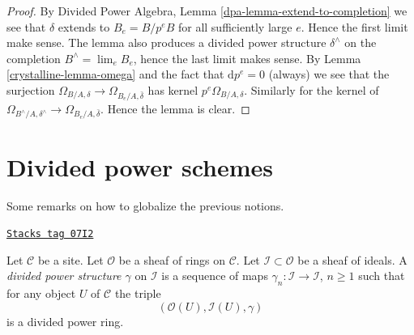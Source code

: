 \begin{proof}

By Divided Power Algebra, Lemma \ref{dpa-lemma-extend-to-completion}
we see that $\delta$ extends
to $B_e = B/p^eB$ for all sufficiently large $e$. Hence the first limit
make sense. The lemma also produces a divided power structure $\delta^\wedge$
on the completion $B^\wedge = \lim_e B_e$, hence the last limit makes
sense. By Lemma \ref{crystalline-lemma-omega}
and the fact that $\text{d}p^e = 0$ (always)
we see that the surjection
$\Omega_{B/A, \delta} \to \Omega_{B_e/A, \bar\delta}$ has kernel
$p^e\Omega_{B/A, \delta}$. Similarly for the kernel of
$\Omega_{B^\wedge/A, \delta^\wedge} \to \Omega_{B_e/A, \bar\delta}$.
Hence the lemma is clear.
\end{proof}

\section{Divided power schemes}
\label{crystalline-section-divided-power-schemes}
Some remarks on how to globalize the previous notions.

\begin{definition}
\label{crystalline-definition-divided-power-structure}
\href{https://stacks.math.columbia.edu/tag/07I2}{\texttt{Stacks tag 07I2}}

Let $\mathcal{C}$ be a site. Let $\mathcal{O}$ be a sheaf of rings
on $\mathcal{C}$. Let $\mathcal{I} \subset \mathcal{O}$ be a
sheaf of ideals. A {\it divided power structure $\gamma$} on $\mathcal{I}$
is a sequence of maps $\gamma_n : \mathcal{I} \to \mathcal{I}$, $n \geq 1$
such that for any object $U$ of $\mathcal{C}$ the triple
$$
(\mathcal{O}(U), \mathcal{I}(U), \gamma)
$$
is a divided power ring.
\end{definition}

